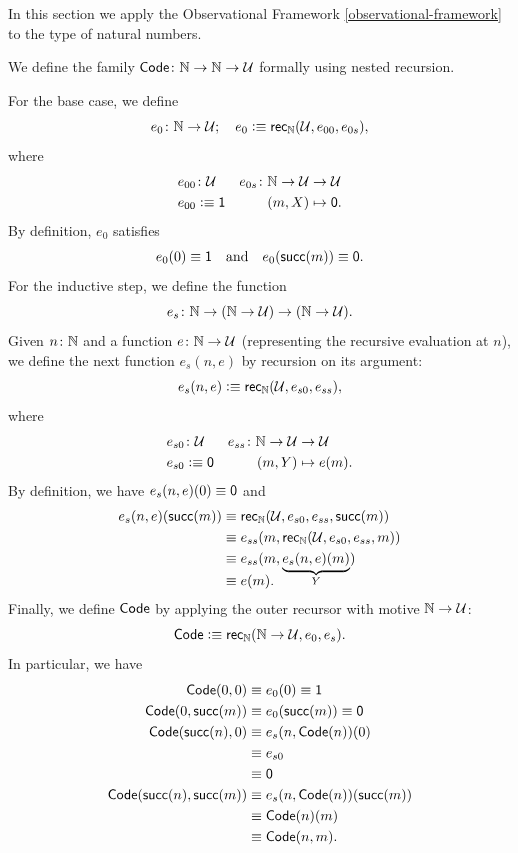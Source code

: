 In this section we apply the Observational Framework \ref{observational-framework} to the type of natural numbers.
\begin{description}[font=\normalfont\scshape]
    \item[Code family.] We define the family $\fun{Code}\colon\N\to\N\to\univ$ formally using nested recursion. 
    
    For the base case, we define
    \[
        e_0\colon\N\to\univ;\quad
        e_0\defeq\fun{rec}_\N(\univ,e_{00},e_{0s}),
    \]
    where
    \begin{align*}
        e_{00}&\colon\univ
        &e_{0s}\colon\N\to\univ&\to\univ\\
        e_{00}&\defeq\fun1
        &(m,X)&\mapsto\fun0.
    \end{align*}
    By definition, $e_0$ satisfies
    \[
        e_0(0)\equiv\mathsf{1}
        \quad\text{and}\quad
        e_0(\mathsf{succ}(m))\equiv\mathsf{0}.
    \]
    For the inductive step, we define the function
    \[
        e_s\colon\N\to(\N\to\univ)\to(\N\to\univ).
    \]
    Given $n\colon\N$ and a function $e\colon\N\to\univ$ (representing the recursive evaluation at $n$), we define the next function $e_s(n,e)$ by recursion on its argument:
    \[
        e_s(n,e)\mathrel{\vcentcolon}\equiv\mathsf{rec}_{\mathbb{N}}(\mathcal U,e_{s0},e_{ss}),
    \]
    where
    \begin{align*}
        e_{s0}&\colon\univ
        &e_{ss}\colon\N\to\univ&\to\univ\\
        e_{s0}&\defeq\fun0
        &(m,Y)&\mapsto e(m).
    \end{align*}
    By definition, we have $e_s(n,e)(0)\equiv\mathsf{0}$ and
    \begin{align*}
        e_s(n,e)(\mathsf{succ}(m))
            &\equiv\mathsf{rec}_{\mathbb{N}}(\mathcal U,e_{s0},e_{ss},\mathsf{succ}(m))\\
            &\equiv e_{ss}(m,\mathsf{rec}_{\mathbb{N}}(\mathcal U,e_{s0},e_{ss},m))\\
            &\equiv e_{ss}(m,\underbrace{e_s(n,e)(m)}_Y)\\[-4.5mm]
            &\equiv e(m).
    \end{align*}
    Finally, we define $\mathsf{Code}$ by applying the outer recursor with motive $\mathbb{N}\to\mathcal U$:
    \[
        \mathsf{Code}\mathrel{\vcentcolon}\equiv\mathsf{rec}_{\mathbb{N}}(\mathbb{N}\to\mathcal U,e_0,e_s).
    \]
    In particular, we have
    \begin{align*}
        \mathsf{Code}(0,0)
            &\equiv e_0(0)\equiv\mathsf{1}\\
        \mathsf{Code}(0,\mathsf{succ}(m))
            &\equiv e_0(\mathsf{succ}(m))\equiv\mathsf{0}\\
        \mathsf{Code}(\mathsf{succ}(n),0)
            &\equiv e_s(n,\mathsf{Code}(n))(0)\\
            &\equiv e_{s0}\\
            &\equiv\mathsf{0}\\
        \mathsf{Code}(\mathsf{succ}(n),\mathsf{succ}(m))
            &\equiv e_s(n,\mathsf{Code}(n))(\mathsf{succ}(m))\\
            &\equiv\mathsf{Code}(n)(m)\\
            &\equiv\mathsf{Code}(n,m).
    \end{align*}


\end{description}
